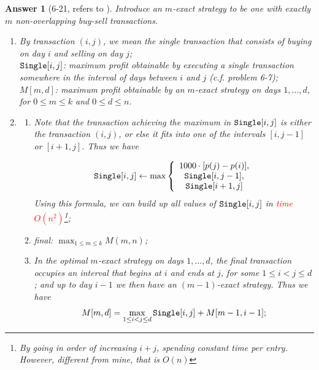 \documentclass[11pt]{article}
\theoremstyle{numberplain}
\theoremstyle{nonumberplain}
\newtheorem{ans}{Answer}
\newcommand{\dps}{\displaystyle}
\newcommand{\0}{{\mathbf{0}}}
\begin{document}
\begin{ans}[6-21, refers to \cite{solcornell}]

Introduce an {\em $m$-exact strategy}
to be one with {\em exactly} $m$ non-overlapping buy-sell transactions.

\begin{enumerate}
\item By {\em transaction $(i,j)$}, we mean the single transaction that consists of buying
on day $i$ and selling on day $j$; \\
${\tt Single}[i,j]$: maximum profit obtainable by executing a single transaction somewhere in the interval of days between $i$ and $j$ (c.f. problem 6-7);\\
$M[m,d]$: maximum profit obtainable 
by an $m$-exact strategy on days $1, \ldots, d$,
for $0 \leq m \leq k$ and $0 \leq d \leq n$.
\item 
\begin{enumerate}
	\item Note that the transaction achieving the maximum in ${\tt Single}[i,j]$ is either the transaction $(i,j)$, or else it fits into one of the intervals $[i,j-1]$ or $[i+1,j]$. Thus we have 
	
	\begin{equation}
	{\tt Single}[i,j] \leftarrow  \max\left\{
	\begin{array}{c}
	1000\cdot [p(j)-p(i)], \\{\tt Single}[i,j-1], \\{\tt Single}[i+1,j]	
	\end{array}
\right.
	\label{eq:6.21 computation of single}
	\end{equation}
	Using this formula, we can build up all values of ${\tt Single}[i,j]$ in \textcolor{red}{time $O(n^2)$}\footnote{By going in order of increasing $i+j$, spending constant time per entry. However, different from mine, that is $O(n)$};
\item final: $\dps \max_{1\leq m\leq k}M(m,n)$;
\item In the optimal $m$-exact strategy on days $1, \ldots, d$, the final transaction occupies an interval that begins at $i$ and ends at $j$, for some $1 \leq i < j \leq d$; and up to day $i-1$ we then have an $(m-1)$-exact strategy. Thus we have $$M[m,d] = \max_{1 \leq i < j \leq d} {\tt Single}[i,j] + M[m-1,i-1];$$

\end{enumerate}



\end{enumerate}
\end{ans}
\end{document}
